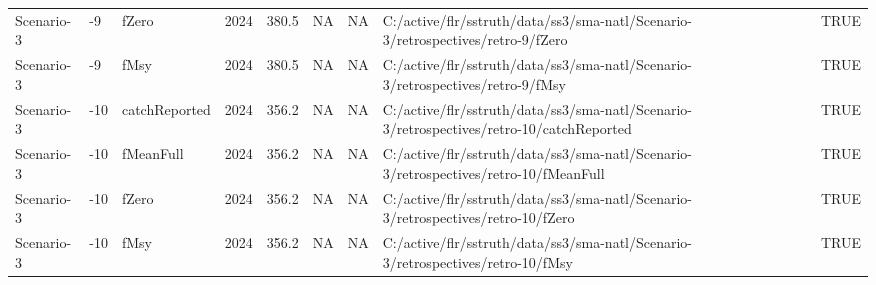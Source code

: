 \begin{table}
\begin{tabular}[t]{lllrrrrll}
Scenario-3 & -9 & fZero & 2024 & 380.5 & NA & NA & C:/active/flr/sstruth/data/ss3/sma-natl/Scenario-3/retrospectives/retro-9/fZero & TRUE\\
Scenario-3 & -9 & fMsy & 2024 & 380.5 & NA & NA & C:/active/flr/sstruth/data/ss3/sma-natl/Scenario-3/retrospectives/retro-9/fMsy & TRUE\\
Scenario-3 & -10 & catchReported & 2024 & 356.2 & NA & NA & C:/active/flr/sstruth/data/ss3/sma-natl/Scenario-3/retrospectives/retro-10/catchReported & TRUE\\
\addlinespace
Scenario-3 & -10 & fMeanFull & 2024 & 356.2 & NA & NA & C:/active/flr/sstruth/data/ss3/sma-natl/Scenario-3/retrospectives/retro-10/fMeanFull & TRUE\\
Scenario-3 & -10 & fZero & 2024 & 356.2 & NA & NA & C:/active/flr/sstruth/data/ss3/sma-natl/Scenario-3/retrospectives/retro-10/fZero & TRUE\\
Scenario-3 & -10 & fMsy & 2024 & 356.2 & NA & NA & C:/active/flr/sstruth/data/ss3/sma-natl/Scenario-3/retrospectives/retro-10/fMsy & TRUE\\
\bottomrule
\end{tabular}
\end{table}

